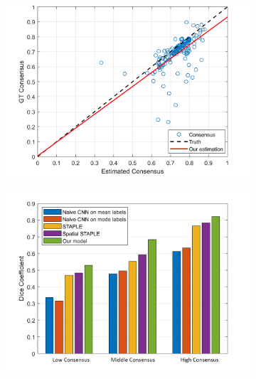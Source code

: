 \begin{figure}[t!] 
	\center
        \begin{subfigure}[]{0.75\linewidth}
        		\caption{}
        		\includegraphics[width=\linewidth]{chapter_8_neurips/picture18.jpg}
        \end{subfigure}
        \hfill
        \begin{subfigure}[]{0.75\linewidth}         
	        \vspace{3mm}
	         \caption{}
	         \vspace{-3mm}
        		 \includegraphics[width=\linewidth]{chapter_8_neurips/picture19.jpg}
        \end{subfigure}
       

\end{figure}
